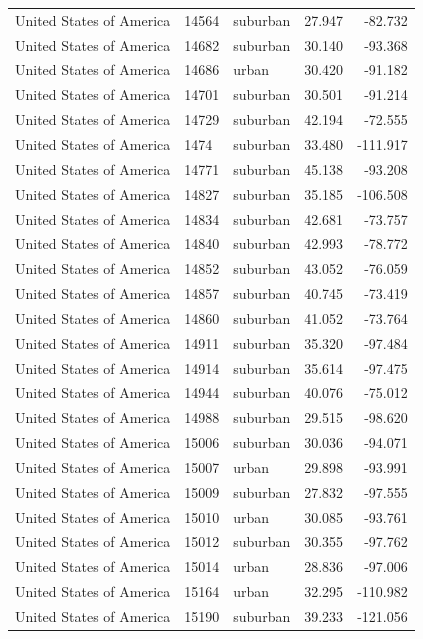 \documentclass{article}
\begin{document}
\begin{longtable}{lllrr}
United States of America & 14564 & suburban & 27.947 & -82.732 \\ 
United States of America & 14682 & suburban & 30.140 & -93.368 \\ 
United States of America & 14686 & urban & 30.420 & -91.182 \\ 
United States of America & 14701 & suburban & 30.501 & -91.214 \\ 
United States of America & 14729 & suburban & 42.194 & -72.555 \\ 
United States of America & 1474 & suburban & 33.480 & -111.917 \\ 
United States of America & 14771 & suburban & 45.138 & -93.208 \\ 
United States of America & 14827 & suburban & 35.185 & -106.508 \\ 
United States of America & 14834 & suburban & 42.681 & -73.757 \\ 
United States of America & 14840 & suburban & 42.993 & -78.772 \\ 
United States of America & 14852 & suburban & 43.052 & -76.059 \\ 
United States of America & 14857 & suburban & 40.745 & -73.419 \\ 
United States of America & 14860 & suburban & 41.052 & -73.764 \\ 
United States of America & 14911 & suburban & 35.320 & -97.484 \\ 
United States of America & 14914 & suburban & 35.614 & -97.475 \\ 
United States of America & 14944 & suburban & 40.076 & -75.012 \\ 
United States of America & 14988 & suburban & 29.515 & -98.620 \\ 
United States of America & 15006 & suburban & 30.036 & -94.071 \\ 
United States of America & 15007 & urban & 29.898 & -93.991 \\ 
United States of America & 15009 & suburban & 27.832 & -97.555 \\ 
United States of America & 15010 & urban & 30.085 & -93.761 \\ 
United States of America & 15012 & suburban & 30.355 & -97.762 \\ 
United States of America & 15014 & urban & 28.836 & -97.006 \\ 
United States of America & 15164 & urban & 32.295 & -110.982 \\ 
United States of America & 15190 & suburban & 39.233 & -121.056 \\ 

\end{longtable}
\end{document}
